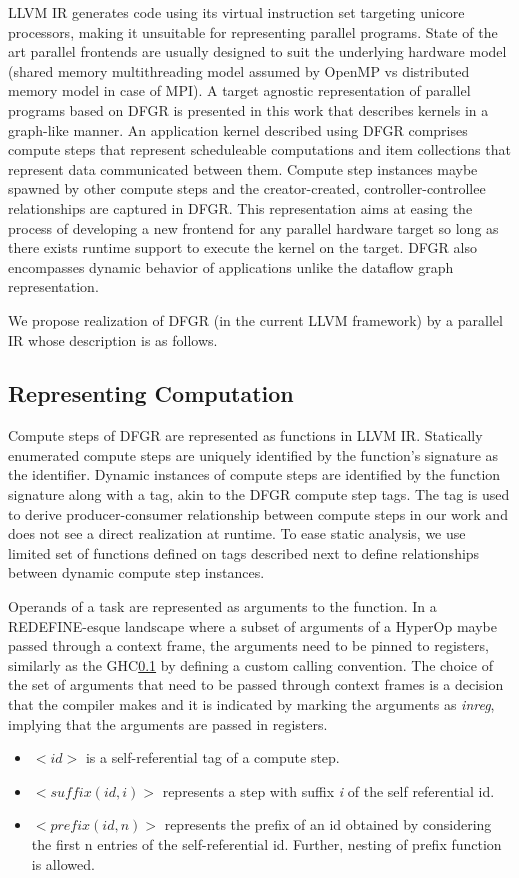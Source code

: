 \label{sec:llvm_ir}
LLVM IR generates code using its virtual instruction set targeting unicore processors, making it unsuitable for representing parallel programs. State of the art parallel frontends are usually designed to suit the underlying hardware model (shared memory multithreading model assumed by OpenMP vs distributed memory model in case of MPI). A target agnostic representation of parallel programs based on DFGR\cite{} is presented in this work that describes kernels in a graph-like manner. An application kernel described using DFGR comprises compute steps that represent scheduleable computations and item collections that represent data communicated between them. Compute step instances maybe spawned by other compute steps and the creator-created, controller-controllee relationships are captured in DFGR. This representation aims at easing the process of developing a new frontend for any parallel hardware target so long as there exists runtime support to execute the kernel on the target. DFGR also encompasses dynamic behavior of applications unlike the dataflow graph representation.

We propose realization of DFGR (in the current LLVM framework) by a parallel IR whose description is as follows.
\subsection{Representing Computation}
Compute steps of DFGR are represented as functions in LLVM IR. Statically enumerated compute steps are uniquely identified by the function's signature as the identifier. Dynamic instances of compute steps are identified by the function signature along with a tag, akin to the DFGR compute step tags. The tag is used to derive producer-consumer relationship between compute steps in our work and does not see a direct realization at runtime. To ease static analysis, we use limited set of functions defined on tags described next to define relationships between dynamic compute step instances. 

Operands of a task are represented as arguments to the function. In a REDEFINE-esque landscape where a subset of arguments of a HyperOp maybe passed through a context frame, the arguments need to be pinned to registers, similarly as the GHC\ref{} by defining a custom calling convention. The choice of the set of arguments that need to be passed through context frames is a decision that the compiler makes and it is indicated by marking the arguments as \textit{inreg}, implying that the arguments are passed in registers.
\begin{itemize}
 \item $<id>$ is a self-referential tag of a compute step.
 \item $<suffix(id,i)>$ represents a step with suffix \textit{i} of the self referential id. 
 \item $<prefix(id,n)>$ represents the prefix of an id obtained by considering the first n entries of the self-referential id. Further, nesting of prefix function is allowed.
\end{itemize}

